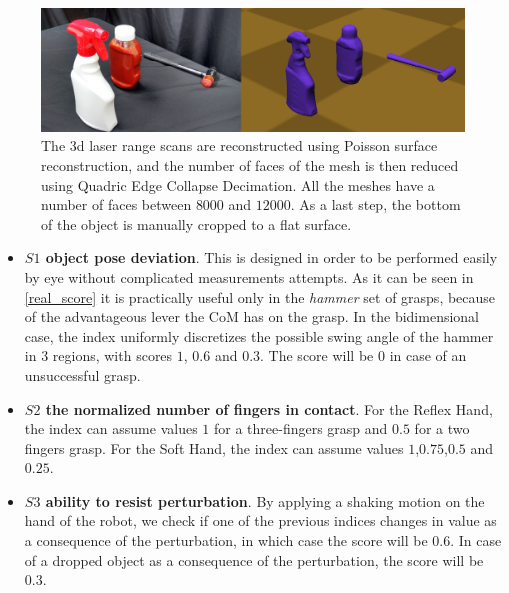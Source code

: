 \begin{figure}[!hbt]
\begin{center}
        \includegraphics[width=0.95\columnwidth]     {images/ssoch/objects}
        \caption{The 3d laser range scans are reconstructed using Poisson surface reconstruction, and the number of faces of the mesh is then reduced using Quadric Edge Collapse Decimation. All the meshes have a number of faces between $8000$ and $12000$. As a last step, the bottom of the object is manually cropped to a flat surface.}
        \label{meshes}
        \end{center}
\end{figure}




\begin{itemize}
\item \textbf{$S1$ object pose deviation}. This is designed in order to be performed easily by eye without complicated measurements attempts. As it can be seen in \ref{real_score} it is practically useful only in the \emph{hammer} set of grasps, because of the advantageous lever the CoM has on the grasp. In the bidimensional case, the index uniformly discretizes the possible swing angle of the hammer in $3$ regions, with scores $1$, $0.6$ and $0.3$. The score will be $0$ in case of an unsuccessful grasp.
\item \textbf{$S2$ the normalized number of fingers in contact}. For the Reflex Hand, the index can assume values $1$ for a three-fingers grasp and $0.5$ for a two fingers grasp. For the Soft Hand, the index can assume values $1$,$0.75$,$0.5$ and $0.25$.
\item \textbf{$S3$ ability to resist perturbation}. By applying a shaking motion on the hand of the robot, we check if one of the previous indices changes in value as a consequence of the perturbation, in which case the score will be $0.6$. In case of a dropped object as a consequence of the perturbation, the score will be $0.3$.
\end{itemize}



